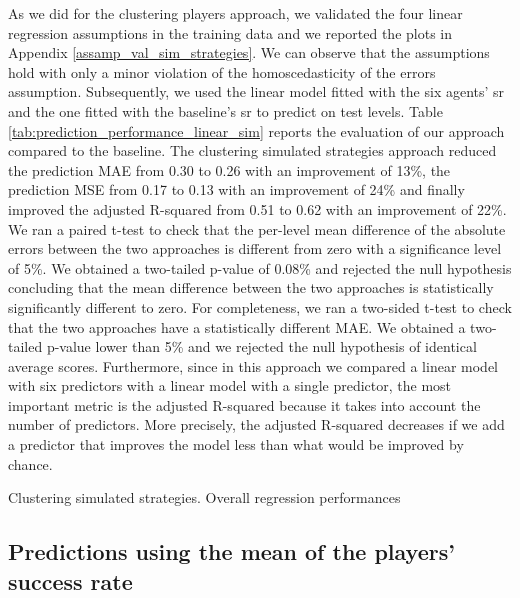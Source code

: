 As we did for the clustering players approach, we validated the four linear regression assumptions in the training data and we reported the plots in Appendix \ref{assamp_val_sim_strategies}. We can observe that the assumptions hold with only a minor violation of the homoscedasticity of the errors assumption. 
Subsequently, we used the linear model fitted with the six agents' \acs{sr} and the one fitted with the baseline's \acs{sr} to predict on test levels. Table \ref{tab:prediction_performance_linear_sim} reports the evaluation of our approach compared to the baseline. The clustering simulated strategies approach reduced the prediction MAE from 0.30 to 0.26 with an improvement of 13\%, the prediction MSE from 0.17 to 0.13 with an improvement of 24\% and finally improved the adjusted R-squared from 0.51 to 0.62 with an improvement of 22\%. 
We ran a paired t-test to check that the per-level mean difference of the absolute errors between the two approaches is different from zero with a significance level of 5\%. We obtained a two-tailed p-value of 0.08\% and rejected the null hypothesis concluding that the mean difference between the two approaches is statistically significantly different to zero.
For completeness, we ran a two-sided t-test to check that the two approaches have a statistically different \acs{MAE}. We obtained a two-tailed p-value lower than 5\% and we rejected the null hypothesis of identical average scores. Furthermore, since in this approach we compared a linear model with six predictors with a linear model with a single predictor, the most important metric is the adjusted R-squared because it takes into account the number of predictors. More precisely, the adjusted R-squared decreases if we add a predictor that improves the model less than what would be improved by chance. 
\begin{table}[h!]
    \centering
    \small
    \caption{Clustering simulated strategies. Overall regression performances} 
    
    \label{tab:prediction_performance_linear_sim}
\end{table} 


\subsection*{Predictions using the mean of the players’ success rate}

